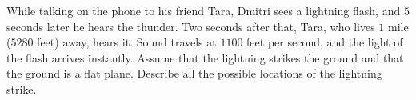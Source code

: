 While talking on the phone to his friend Tara, Dmitri sees a lightning flash, and $5$ seconds later he hears the thunder. Two seconds after that, Tara, who lives $1$ mile ($5280$ feet) away, hears it. Sound travels at $1100$ feet per second, and the light of the flash arrives instantly. Assume that the lightning strikes the ground and that the ground is a flat plane. Describe all the possible locations of the lightning strike.
